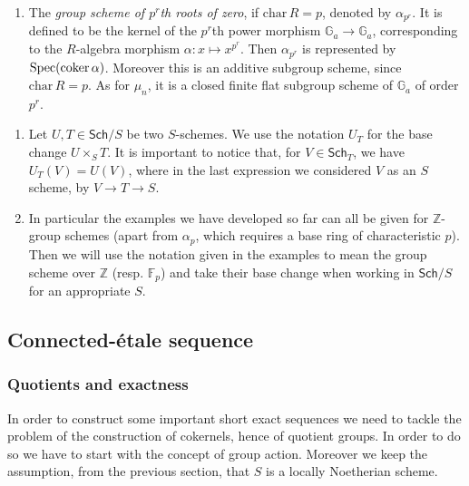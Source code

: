 \begin{ex}
\begin{enumerate}
		\item The \emph{group scheme of $p^r$th roots of zero},
			if $\mathrm{char}\, R = p$, denoted by $\alpha_{p^r}$. 
			It is defined to be the kernel of the $p^r$th power
			morphism $\mathbb{G}_a \to \mathbb{G}_a$,
			corresponding to the $R$-algebra morphism
			$\alpha\colon x \mapsto x^{p^r}$.
			Then $\alpha_{p^r}$ is represented by $\operatorname{Spec}(\operatorname{coker} \alpha)$.
			Moreover this is an additive subgroup scheme, since $\mathrm{char}\, R = p$.
			As for $\mu_n$, it is a closed finite flat subgroup scheme of 
			$\mathbb{G}_a$ of order \(p^r\).
	\end{enumerate}
\end{ex}


\begin{rem}\leavevmode\vspace{-0.2\baselineskip}
\begin{enumerate}
\item 	Let $U, T \in \mathsf{Sch}/S$ be two $S$-schemes.
	We use the notation $U_T$ for the base change $U \times_{ S } T$.
	It is important to notice that, for $V \in \mathsf{Sch}_{ T }$, we 
	have $U_T(V) = U(V)$, where in the last expression
	we considered $V$ as an $S$ scheme, by $V \to T \to S$.


\item	In particular the examples we have developed so far 
	can all be given for $\mathbb{Z}$-group schemes
	(apart from $\alpha_p$, which requires a base ring
	of characteristic $p$).
	Then we will use the notation given in the examples
	to mean the group scheme over $\mathbb{Z}$ (resp$.$ $\mathbb{F}_{p}$)
	and take their base change when working in $\mathsf{Sch}/S$
	for an appropriate $S$.
\end{enumerate}
\end{rem}


\subsection{Connected-étale sequence}
\subsubsection{Quotients and exactness}
In order to construct some important short exact sequences
we need to tackle the problem of the construction
of cokernels, hence of quotient groups.
In order to do so we have to start with the concept of group action.
Moreover we keep the assumption, from the previous section, that $S$
is a locally Noetherian scheme.

